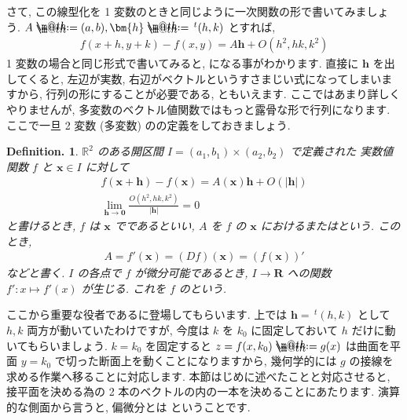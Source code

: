 \documentclass[openany, a4paper, oneside]{jsbook}
\makeatletter
\newcommand*{\defeq}{\mathrel{\rlap{%
\raisebox{0.3ex}{$\m@th\cdot$}}%
\raisebox{-0.3ex}{$\m@th\cdot$}}%
=}
\theoremstyle{break}
\theoremstyle{breakdefn}
\newtheorem{defn}[thm]{Definition.}
\newcommand{\bbR}{\mathbb{R}}
\makeatother
\begin{document}
さて, この線型化を 1 変数のときと同じように一次関数の形で書いてみましょう.
 $A\defeq(a,b),\bm{h}\defeq\,^t (h,k)$ とすれば,
    \begin{align}
        f (x+h,y+k) - f (x,y)
        =
        A \bm{h} + O (h^2,h k,k^2)
    \end{align}
1 変数の場合と同じ形式で書いてみると, になる事がわかります.
直接に $\bm{h}$ を出してくると, 左辺が実数, 右辺がベクトルというすさまじい式になってしまいますから, 行列の形にすることが必要である, ともいえます.
ここではあまり詳しくやりませんが, 多変数のベクトル値関数ではもっと露骨な形で行列になります.
ここで一旦 2 変数 (多変数) のの定義をしておきましょう.
    \begin{defn} $\bbR^2$ のある開区間 $I=(a_1,b_1)\times (a_2,b_2)$ で定義された
実数値関数 $f$ と $\bm{x} \in I$ に対して
    \begin{gather}
        f (\bm{x}+\bm{h}) - f (\bm{x}) = A (\bm{x})\bm{h} + O\left ( |\bm{h}| \right) \\
        \lim_{\bm{h} \to \bm{0}}\frac{O (h^2,h k,k^2 )}{|\bm{h}|}=0
    \end{gather}
と書けるとき,  $f$ は $\bm{x}$ でであるといい,
 $A$ を $f$ の $\bm{x}$ におけるまたはという.
このとき,
    \begin{align}       A=f'(\bm{x})=(Df) (\bm{x})=\left ( f (\bm{x}) \right) '
    \end{align}
などと書く.  $I$ の各点で $f$ が微分可能であるとき,  $I \to \bm{R}$ への関数
 $f':x \mapsto f'(x)$ が生じる. これを $f$ のという.
\end{defn}

ここから重要な役者であるに登場してもらいます.
上では $\bm{h}=\,^t (h,k)$ として $h,k$ 両方が動いていたわけですが, 今度は $k$ を $k_0$ に固定しておいて $h$ だけに動いてもらいましょう.
 $k=k_0$ を固定すると $z=f (x,k_0)\defeq g (x)$ は曲面を平面 $y=k_0$ で切った断面上を動くことになりますから,
幾何学的には $g$ の接線を求める作業へ移ることに対応します.
本節はじめに述べたことと対応させると, 接平面を決める為の 2 本のベクトルの内の一本を決めることにあたります.
演算的な側面から言うと, 偏微分とは
ということです.
\end{document}
